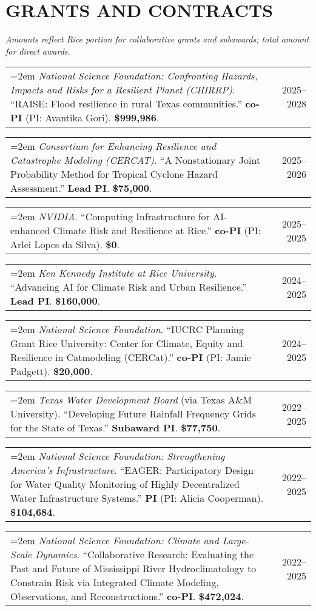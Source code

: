 \documentclass[10pt,oneside]{article}
\makeatletter
\newenvironment{alignedentrieshang}[1][2em]{%
  \noindent%
}{%
}
\newcommand{\hangingitem}[2]{%
  \noindent%
  \begin{tabular*}{\textwidth}{@{}p{0.85\textwidth}@{\extracolsep{\fill}}r@{}}%
    \hangindent=2em \hangafter=1 #1 & #2%
  \end{tabular*}%
}
\makeatother
\begin{document}

\section{GRANTS AND CONTRACTS}

\textit{Amounts reflect Rice portion for collaborative grants and subawards; total amount for direct awards.}

\bigskip

\begin{alignedentrieshang}

\hangingitem{\textit{National Science Foundation}\textit{: Confronting Hazards, Impacts and Risks for a Resilient Planet (CHIRRP)}. ``RAISE: Flood resilience in rural Texas communities.'' \textbf{co-PI} (PI: Avantika Gori). \textbf{\$999,986}.}{2025--2028}

\hangingitem{\textit{Consortium for Enhancing Resilience and Catastrophe Modeling (CERCAT)}. ``A Nonstationary Joint Probability Method for Tropical Cyclone Hazard Assessment.'' \textbf{Lead PI}. \textbf{\$75,000}.}{2025--2026}

\hangingitem{\textit{NVIDIA}. ``Computing Infrastructure for AI-enhanced Climate Risk and Resilience at Rice.'' \textbf{co-PI} (PI: Arlei Lopes da Silva). \textbf{\$0}.}{2025--2025}

\hangingitem{\textit{Ken Kennedy Institute at Rice University}. ``Advancing AI for Climate Risk and Urban Resilience.'' \textbf{Lead PI}. \textbf{\$160,000}.}{2024--2025}

\hangingitem{\textit{National Science Foundation}. ``IUCRC Planning Grant Rice University: Center for Climate, Equity and Resilience in Catmodeling (CERCat).'' \textbf{co-PI} (PI: Jamie Padgett). \textbf{\$20,000}.}{2024--2025}

\hangingitem{\textit{Texas Water Development Board} (via Texas A\&M University). ``Developing Future Rainfall Frequency Grids for the State of Texas.'' \textbf{Subaward PI}. \textbf{\$77,750}.}{2022--2025}

\hangingitem{\textit{National Science Foundation}\textit{: Strengthening America's Infrastructure}. ``EAGER: Participatory Design for Water Quality Monitoring of Highly Decentralized Water Infrastructure Systems.'' \textbf{PI} (PI: Alicia Cooperman). \textbf{\$104,684}.}{2022--2025}

\hangingitem{\textit{National Science Foundation}\textit{: Climate and Large-Scale Dynamics}. ``Collaborative Research: Evaluating the Past and Future of Mississippi River Hydroclimatology to Constrain Risk via Integrated Climate Modeling, Observations, and Reconstructions.'' \textbf{co-PI}. \textbf{\$472,024}.}{2022--2025}


\end{alignedentrieshang}
\end{document}
